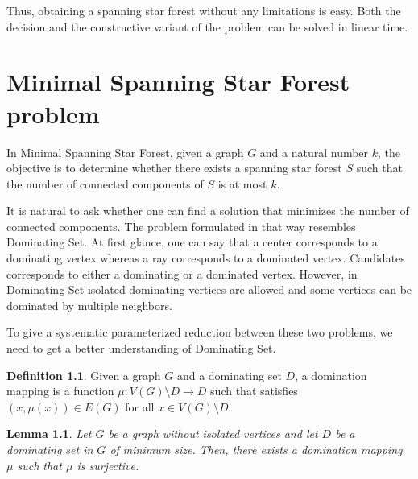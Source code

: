 \documentclass[en]{pracamgr}
\newtheorem{lemma}{Lemma}
\theoremstyle{definition}
\newtheorem{definition}{Definition}
\newcommand{\ssf}{spanning star forest}
\newcommand{\mssfp}{{\sc Minimal Spanning Star Forest}}
\newcommand{\domsetp}{{\sc Dominating Set}}
\begin{document}
Thus, obtaining a \ssf{} without any limitations is easy. Both the decision and the constructive variant of the problem can be solved in linear time.

\chapter{Minimal Spanning Star Forest problem}\label{sec4}

In \mssfp{}, given a graph $G$ and a natural number $k$, the objective is to determine whether there exists a \ssf{} $S$ such that the number of connected components of $S$ is at most $k$.

It is natural to ask whether one can find a solution that minimizes the number of connected components. The problem formulated in that way resembles \domsetp{}. At first glance, one can say that a center corresponds to a dominating vertex whereas a ray corresponds to a dominated vertex. Candidates corresponds to either a dominating or a dominated vertex. However, in \domsetp{} isolated dominating vertices are allowed and some vertices can be dominated by multiple neighbors. 

To give a systematic parameterized reduction between these two problems, we need to get a better understanding of \domsetp{}.

\begin{definition}
	Given a graph $G$ and a dominating set $D$, a {\normalfont domination mapping} is a function $\mu:V(G) \setminus D \rightarrow D$ such that satisfies $(x,\mu(x)) \in E(G)$ for all $x \in V(G) \setminus D$.
\end{definition}

\begin{lemma}\label{dom mapping}
	Let $G$ be a graph without isolated vertices and let $D$ be a dominating set in $G$ of minimum size. Then, there exists a domination mapping $\mu$ such that $\mu$ is surjective.
\end{lemma}
\end{document}
